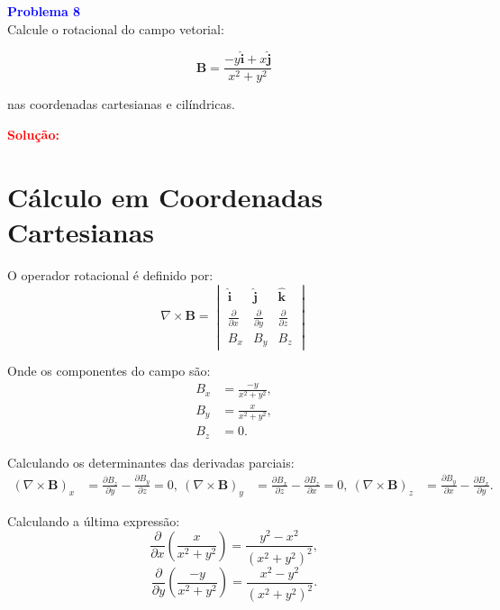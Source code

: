 \documentclass[a4paper,12pt]{article}
\begin{document}
\begin{flushleft}
\textbf{\textcolor{blue}{Problema 8}}\\

Calcule o rotacional do campo vetorial:

\[
\mathbf{B} = \frac{-y \hat{\mathbf{i}} + x \hat{\mathbf{j}}}{x^2 + y^2}
\]

nas coordenadas cartesianas e cilíndricas.

\textcolor{red}{\textbf{Solução:}}\\

\section*{Cálculo em Coordenadas Cartesianas}
O operador rotacional é definido por:
\begin{equation}
\nabla \times \mathbf{B} =
\begin{vmatrix}
\hat{\mathbf{i}} & \hat{\mathbf{j}} & \hat{\mathbf{k}} \\
\frac{\partial}{\partial x} & \frac{\partial}{\partial y} & \frac{\partial}{\partial z} \\
B_x & B_y & B_z
\end{vmatrix}
\end{equation}

Onde os componentes do campo  são:
\begin{align}
B_x &= \frac{-y}{x^2 + y^2}, \\
B_y &= \frac{x}{x^2 + y^2}, \\
B_z &= 0.
\end{align}

Calculando os determinantes das derivadas parciais:
\begin{align}
\left(\nabla \times \mathbf{B} \right)_x &= \frac{\partial B_z}{\partial y} - \frac{\partial B_y}{\partial z} = 0, \
\left(\nabla \times \mathbf{B} \right)_y &= \frac{\partial B_x}{\partial z} - \frac{\partial B_z}{\partial x} = 0, \
\left(\nabla \times \mathbf{B} \right)_z &= \frac{\partial B_y}{\partial x} - \frac{\partial B_x}{\partial y}.
\end{align}

Calculando a última expressão:
\begin{equation}
\frac{\partial}{\partial x} \left( \frac{x}{x^2 + y^2} \right) = \frac{y^2 - x^2}{(x^2 + y^2)^2},
\end{equation}
\begin{equation}
\frac{\partial}{\partial y} \left( \frac{-y}{x^2 + y^2} \right) = \frac{x^2 - y^2}{(x^2 + y^2)^2}.
\end{equation}


\end{flushleft}
\end{document}
